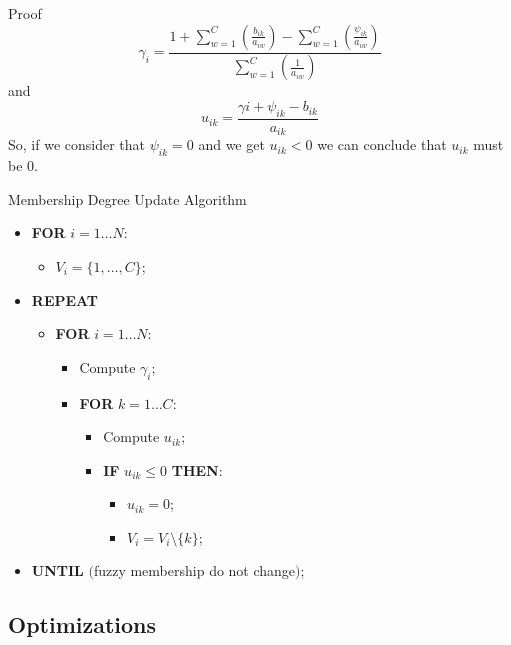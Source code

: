 \documentclass{beamer}
\begin{document}
\begin{frame}{Proof}
\begin{displaymath}
\gamma_{i} = 
\frac
{
1
+
\sum_{w=1}^{C}
\left (
\frac{b_{ik}}{a_{iw}}
\right )
-
\sum_{w=1}^{C}
\left (
\frac{\psi_{ik}}{a_{iw}}
\right )
}
{
\sum_{w=1}^{C}
\left (
\frac
{1}
{a_{iw}}
\right )
}
\end{displaymath}
and
\begin{displaymath}
u_{ik} =
\frac
{\gamma{i} + \psi_{ik} - b_{ik}}
{a_{ik}}
\end{displaymath}
So, if we consider that $\psi_{ik} = 0$ and we get $u_{ik} < 0$ we can conclude that $u_{ik}$ must be $0$.
\end{frame}

\begin{frame}{Membership Degree Update Algorithm}
\begin{itemize}
\item[]\textbf{FOR} $i = 1 \ldots N$:
\begin{itemize}
	\item[]$V_{i}=\{1,\ldots,C\}$;
\end{itemize}
\item[]\textbf{REPEAT}
\begin{itemize}
	\item[]\textbf{FOR} $i = 1 \ldots N$:
	\begin{itemize}
		\item[]Compute $\gamma_{i}$;
		\item[]\textbf{FOR} $k = 1 \ldots C$:
		\begin{itemize}
			\item[]Compute $u_{ik}$;
			\item[]\textbf{IF} $u_{ik} \leq 0$ \textbf{THEN}:
			\begin{itemize}
				\item[]$u_{ik} = 0$;
				\item[]$V_{i}=V_{i}\setminus\{k\}$;
			\end{itemize}
		\end{itemize}
	\end{itemize}
\end{itemize}
\item[]\textbf{UNTIL} $($fuzzy membership do not change$)$;
\end{itemize}
\end{frame}

\subsection{Optimizations}
\end{document}
